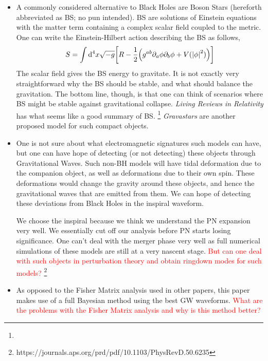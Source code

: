\documentclass[a4paper,11pt]{article}
\begin{document}
\begin{itemize}
	\item A commonly considered alternative to Black Holes are Boson Stars (hereforth abbreviated as BS; no pun intended). BS are solutions of Einstein equations with the matter term containing a complex scalar field coupled to the metric. One can write the Einstein-Hilbert action describing the BS as follows,
	\begin{equation*}
	S = \int \dd^4{x} \sqrt{-g}\qty[R - \dfrac{1}{2} \qty(g^{ab} \partial_a \phi \partial_b \phi   + V(\abs{\phi}^2))]
	\end{equation*}
	The scalar field gives the BS energy to gravitate. It is not exactly very straightforward why the BS should be stable, and what should balance the gravitation. The bottom line, though, is that one can think of scenarios where BS might be stable against gravitational collapse. \textit{Living Reviews in Relativity} has what seems like a good summary of BS. \footnote{} \textit{Gravastars} are another proposed model for such compact objects.
	
	\item One is not sure about what electromagnetic signatures such models can have, but one can have hope of detecting (or not detecting) these objects through Gravitational Waves. Such non-BH models will have tidal deformation due to the companion object, as well as deformations due to their own spin. These deformations would change the gravity around these objects, and hence the gravitational waves that are emitted from them. We can hope of detecting these deviations from Black Holes in the inspiral waveform.
	
	We choose the inspiral because we think we understand the PN expansion very well. We essentially cut off our analysis before PN starts losing significance. One can't deal with the merger phase very well as full numerical simulations of these models are still at a very nascent stage. \textcolor{red}{But can one deal with such objects in perturbation theory and obtain ringdown modes for such models?} \footnote{https://journals.aps.org/prd/pdf/10.1103/PhysRevD.50.6235}
	
	\item As opposed to the Fisher Matrix analysis used in other papers, this paper makes use of a full Bayesian method using the best GW waveforms. \textcolor{red}{What are the problems with the Fisher Matrix analysis and why is this method better?}
	

\end{itemize}
\end{document}
